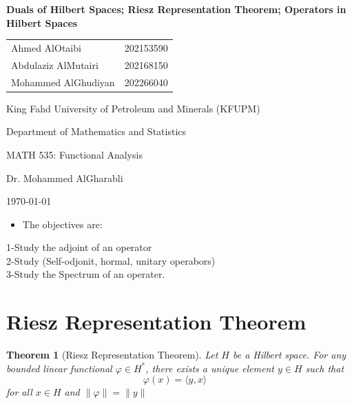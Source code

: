 \documentclass{report}
\newtheorem{thm}{Theorem}
\begin{document}
\begin{titlepage}
  \centering
  {\LARGE\bfseries Duals of Hilbert Spaces; Riesz Representation Theorem; Operators in Hilbert Spaces \par}
  \vspace{2cm}
  {\large
    \begin{tabular}{l l}
      Ahmed AlOtaibi      & 202153590 \\
      Abdulaziz AlMutairi & 202168150 \\
      Mohammed AlGhudiyan & 202266040 \\
    \end{tabular}
  \par}
  \vspace{1cm}
  {\large King Fahd University of Petroleum and Minerals (KFUPM)\par}
  \vspace{1cm}
  {\large Department of Mathematics and Statistics\par}
  \vspace{1cm}
  {\large MATH 535: Functional Analysis\par}
  \vspace{1cm}
  {\large Dr. Mohammed AlGharabli\par}
  \vspace{1cm}
  {\large \today\par}
\end{titlepage}
\tableofcontents
\newpage
\begin{itemize}
  \item The objectives are:
\end{itemize}

1-Study the adjoint of an operator\\
2-Study (Self-odjonit, hormal, unitary operabors)\\
3-Study the Spectrum of an operater.



\section{Riesz Representation Theorem}

\begin{thm}[Riesz Representation Theorem]
    Let $H$ be a Hilbert space.
    For any bounded linear functional $\varphi \in H^{*}$,
    there exists a unique element $y \in H$ such that\\

$$\varphi(x)=\langle y, x\rangle \quad$$ for all $x \in H$ and $\|\varphi\|=\|y\|$ \\

\end{thm}
\end{document}
